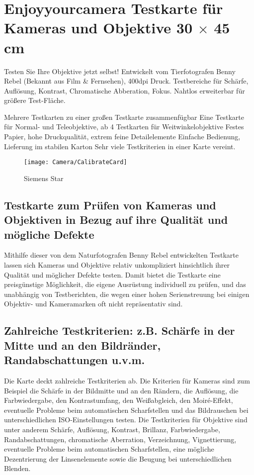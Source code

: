 \section{Enjoyyourcamera Testkarte für Kameras und Objektive 30 $\times$ 45 cm}

Testen Sie Ihre Objektive jetzt selbst! Entwickelt vom Tierfotografen Benny Rebel (Bekannt aus Film \& Fernsehen), 400dpi Druck. Testbereiche für Schärfe, Auflösung, Kontrast, Chromatische Abberation, Fokus. Nahtlos erweiterbar für größere Test-Fläche.

Mehrere Testkarten zu einer großen Testkarte zusammenfügbar
Eine Testkarte für Normal- und Teleobjektive, ab 4 Testkarten für Weitwinkelobjektive
Festes Papier, hohe Druckqualität, extrem feine Detailelemente
Einfache Bedienung, Lieferung im stabilen Karton
Sehr viele Testkriterien in einer Karte vereint.


\begin{figure}
    \begin{center}
        \texttt{[image: Camera/CalibrateCard]}
        
        \caption{Siemens Star}
    \end{center}    
\end{figure}

\subsection{Testkarte zum Prüfen von Kameras und Objektiven in Bezug auf ihre Qualität und mögliche Defekte}

Mithilfe dieser von dem Naturfotografen Benny Rebel entwickelten Testkarte lassen sich Kameras und Objektive relativ unkompliziert hinsichtlich ihrer Qualität und möglicher Defekte testen. Damit bietet die Testkarte eine preisgünstige Möglichkeit, die eigene Ausrüstung individuell zu prüfen, und das unabhängig von Testberichten, die wegen einer hohen Serienstreuung bei einigen Objektiv- und Kameramarken oft nicht repräsentativ sind.

\subsection{Zahlreiche Testkriterien: z.B. Schärfe in der Mitte und an den Bildränder, Randabschattungen u.v.m.}

Die Karte deckt zahlreiche Testkriterien ab. Die Kriterien für Kameras sind zum Beispiel die Schärfe in der Bildmitte und an den Rändern, die Auflösung, die Farbwiedergabe, den Kontrastumfang, den Weißabgleich, den Moiré-Effekt, eventuelle Probleme beim automatischen Scharfstellen und das Bildrauschen bei unterschiedlichen ISO-Einstellungen testen. Die Testkriterien für Objektive sind unter anderem Schärfe, Auflösung, Kontrast, Brillanz, Farbwiedergabe, Randabschattungen, chromatische Aberration, Verzeichnung, Vignettierung, eventuelle Probleme beim automatischen Scharfstellen, eine mögliche Dezentrierung der Linsenelemente sowie die Beugung bei unterschiedlichen Blenden.

